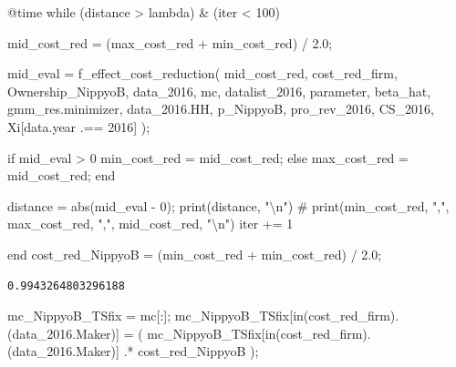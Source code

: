\documentclass[
  letterpaper,
  DIV=11,
  numbers=noendperiod]{scrreprt}
\newenvironment{Shaded}{\begin{snugshade}}{\end{snugshade}}
\newcommand{\CommentTok}[1]{\textcolor[rgb]{0.37,0.37,0.37}{#1}}
\newcommand{\ControlFlowTok}[1]{\textcolor[rgb]{0.00,0.23,0.31}{#1}}
\newcommand{\FloatTok}[1]{\textcolor[rgb]{0.68,0.00,0.00}{#1}}
\newcommand{\FunctionTok}[1]{\textcolor[rgb]{0.28,0.35,0.67}{#1}}
\newcommand{\NormalTok}[1]{\textcolor[rgb]{0.00,0.23,0.31}{#1}}
\newcommand{\OperatorTok}[1]{\textcolor[rgb]{0.37,0.37,0.37}{#1}}
\newcommand{\PreprocessorTok}[1]{\textcolor[rgb]{0.68,0.00,0.00}{#1}}
\newcommand{\SpecialCharTok}[1]{\textcolor[rgb]{0.37,0.37,0.37}{#1}}
\newcommand{\StringTok}[1]{\textcolor[rgb]{0.13,0.47,0.30}{#1}}
\begin{document}
\begin{Shaded}
\begin{Highlighting}[]
\PreprocessorTok{@time} \ControlFlowTok{while}\NormalTok{ (distance }\OperatorTok{\textgreater{}}\NormalTok{ lambda) }\OperatorTok{\&}\NormalTok{ (iter }\OperatorTok{\textless{}} \FloatTok{100}\NormalTok{)}
    
\NormalTok{    mid\_cost\_red }\OperatorTok{=}\NormalTok{ (max\_cost\_red }\OperatorTok{+}\NormalTok{ min\_cost\_red) }\OperatorTok{/} \FloatTok{2.0}\NormalTok{;}
    
\NormalTok{    mid\_eval }\OperatorTok{=} \FunctionTok{f\_effect\_cost\_reduction}\NormalTok{(}
\NormalTok{        mid\_cost\_red,}
\NormalTok{        cost\_red\_firm,}
\NormalTok{        Ownership\_NippyoB,}
\NormalTok{        data\_2016,}
\NormalTok{        mc,}
\NormalTok{        datalist\_2016,}
\NormalTok{        parameter,}
\NormalTok{        beta\_hat,}
\NormalTok{        gmm\_res.minimizer,}
\NormalTok{        data\_2016.HH,}
\NormalTok{        p\_NippyoB,}
\NormalTok{        pro\_rev\_2016,}
\NormalTok{        CS\_2016,}
\NormalTok{        Xi[data.year }\OperatorTok{.==} \FloatTok{2016}\NormalTok{]}
\NormalTok{    );}
    
    \ControlFlowTok{if}\NormalTok{ mid\_eval }\OperatorTok{\textgreater{}} \FloatTok{0}
\NormalTok{        min\_cost\_red }\OperatorTok{=}\NormalTok{ mid\_cost\_red;}
    \ControlFlowTok{else}
\NormalTok{        max\_cost\_red }\OperatorTok{=}\NormalTok{ mid\_cost\_red;}
    \ControlFlowTok{end}
    
\NormalTok{    distance }\OperatorTok{=} \FunctionTok{abs}\NormalTok{(mid\_eval }\OperatorTok{{-}} \FloatTok{0}\NormalTok{);}
    \FunctionTok{print}\NormalTok{(distance, }\StringTok{"}\SpecialCharTok{\textbackslash{}n}\StringTok{"}\NormalTok{)}
\CommentTok{\#     print(min\_cost\_red, ",", max\_cost\_red, ",", mid\_cost\_red, "\textbackslash{}n")}
\NormalTok{    iter }\OperatorTok{+=} \FloatTok{1}
    
\ControlFlowTok{end}
\NormalTok{cost\_red\_NippyoB }\OperatorTok{=}\NormalTok{ (min\_cost\_red }\OperatorTok{+}\NormalTok{ min\_cost\_red) }\OperatorTok{/} \FloatTok{2.0}\NormalTok{;}
\end{Highlighting}
\end{Shaded}

\begin{verbatim}
0.9943264803296188
\end{verbatim}

\begin{Shaded}
\begin{Highlighting}[]
\NormalTok{mc\_NippyoB\_TSfix }\OperatorTok{=}\NormalTok{ mc[}\OperatorTok{:}\NormalTok{];}
\NormalTok{mc\_NippyoB\_TSfix[}\FunctionTok{in}\NormalTok{(cost\_red\_firm).(data\_2016.Maker)] }\OperatorTok{=}\NormalTok{ (}
\NormalTok{    mc\_NippyoB\_TSfix[}\FunctionTok{in}\NormalTok{(cost\_red\_firm).(data\_2016.Maker)] }\OperatorTok{.*}\NormalTok{ cost\_red\_NippyoB}
\NormalTok{    );}
\end{Highlighting}
\end{Shaded}
\end{document}
